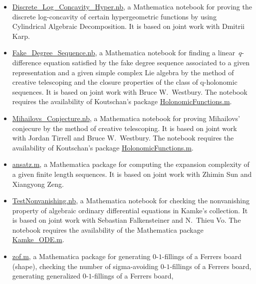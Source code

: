 \documentclass[a4paper,12pt]{article}
\begin{document}
\begin{itemize}
\item \href{https://yzhang1616.github.io/lch/Discrete_Log_Concavity_Hyper.nb}{Discrete\_Log\_Concavity\_Hyper.nb}, a Mathematica notebook for proving the discrete log-concavity of certain hypergeometric functions by using Cylindrical Algebraic Decomposition. It is based on joint work with Dmitrii Karp.
\item \href{https://yzhang1616.github.io/fd/Fake_Degree_Sequence.nb}{Fake\_Degree\_Sequence.nb},  a Mathematica notebook for finding a linear~$q$-difference equation satisfied by the fake degree sequence associated to a given representation and a given simple complex Lie algebra by the method of creative telescoping and the closure properties of the class of q-holonomic sequences.  It is based on joint work
    with Bruce W.\ Westbury.  The notebook requires the availability of Koutschan's package 
 \href{http://www.risc.jku.at/research/combinat/software/ergosum/RISC/HolonomicFunctions.html}{HolonomicFunctions.m}. 
\item \href{https://yzhang1616.github.io/ct/Mihailovs_Conjecture.nb}{Mihailovs\_Conjecture.nb},  a Mathematica notebook for 
proving Mihailovs' conjecure by the method of creative telescoping. It is based on joint work
with Jordan Tirrell and Bruce W.\ Westbury.   The notebook requires the availability of Koutschan's package 
 \href{http://www.risc.jku.at/research/combinat/software/ergosum/RISC/HolonomicFunctions.html}{HolonomicFunctions.m}.
\item \href{https://yzhang1616.github.io/complexity/ansatz.m}{ansatz.m}, 
a Mathematica package for computing the expansion complexity of a given finite length sequences. 
It is based on joint work with Zhimin Sun and Xiangyong Zeng. 
  \item \href{https://yzhang1616.github.io/TestNonvanishing.nb}{TestNonvanishing.nb}, 
    a Mathematica notebook for checking the nonvanishing property of algebraic ordinary
    differential equations in Kamke's collection. It is based on joint work
    with Sebastian Falkensteiner and N.\ Thieu Vo. 
    The notebook requires the availability of the Mathematica package \href{https://yzhang1616.github.io/Kamke_ODE.m}{Kamke\_ODE.m}.
  \item \href{https://yzhang1616.github.io/zof/zof.m}{zof.m}, a Mathematica package for generating $0$-$1$-fillings 
  of a Ferrers board (shape), checking the number of
    sigma-avoiding $0$-$1$-fillings of a Ferrers board, 
     generating generalized $0$-$1$-fillings of a Ferrers board, 

\end{itemize}
\end{document}
